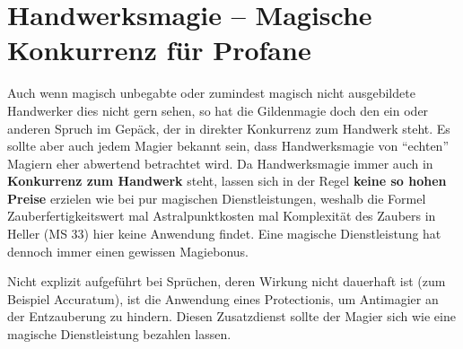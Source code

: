\section{Handwerksmagie -- Magische Konkurrenz für Profane}
Auch wenn magisch unbegabte oder zumindest magisch nicht ausgebildete Handwerker dies nicht gern sehen, so hat die Gildenmagie doch den ein oder anderen Spruch im Gepäck, der in direkter Konkurrenz zum Handwerk steht. Es sollte aber auch jedem Magier bekannt sein, dass Handwerksmagie von \enquote{echten} Magiern eher abwertend betrachtet wird. Da Handwerksmagie immer auch in \textbf{Konkurrenz zum Handwerk} steht, lassen sich in der Regel \textbf{keine so hohen Preise} erzielen wie bei pur magischen Dienstleistungen, weshalb die Formel Zauberfertigkeitswert mal Astralpunktkosten mal Komplexität des Zaubers in Heller (MS 33) hier keine Anwendung findet. Eine magische Dienstleistung hat dennoch immer einen gewissen Magiebonus.

Nicht explizit aufgeführt bei Sprüchen, deren Wirkung nicht dauerhaft ist (zum Beispiel Accuratum), ist die Anwendung eines Protectionis, um Antimagier an der Entzauberung zu hindern. Diesen Zusatzdienst sollte der Magier sich wie eine magische Dienstleistung bezahlen lassen.

